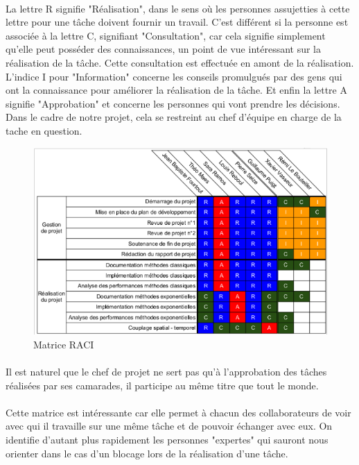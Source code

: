         \paragraph{}
        La lettre R signifie "Réalisation", dans le sens où les personnes assujetties à cette lettre pour une tâche doivent fournir un travail. C'est différent si la personne est associée à la lettre C, signifiant "Consultation", car cela signifie simplement qu'elle peut posséder des connaissances, un point de vue intéressant sur la réalisation de la tâche. Cette consultation est effectuée en amont de la réalisation. L'indice I pour "Information" concerne les conseils promulgués par des gens qui ont la connaissance pour améliorer la réalisation de la tâche. Et enfin la lettre A signifie "Approbation" et concerne les personnes qui vont prendre les décisions. Dans le cadre de notre projet, cela se restreint au chef d'équipe en charge de la tache en question.
        \begin{figure}
            \centering
            \includegraphics[width=\textwidth]{images/raci.png}
            \caption{Matrice RACI} 
            \label{fig:RACI}
        \end{figure}

        \paragraph{}
        Il est naturel que le chef de projet ne sert pas qu'à l'approbation des tâches réalisées par ses camarades, il participe au même titre que tout le monde.

        \paragraph{}
        Cette matrice est intéressante car elle permet à chacun des collaborateurs de voir avec qui il travaille sur une même tâche et de pouvoir échanger avec eux. On identifie d'autant plus rapidement les personnes "expertes" qui sauront nous orienter dans le cas d'un blocage lors de la réalisation d'une tâche.


